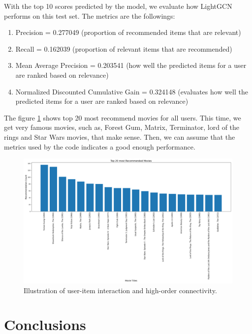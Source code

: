 \documentclass[12pt]{article}
\numberwithin{equation}{section}
\begin{document}
With the top 10 scores predicted by the model, we evaluate how LightGCN performs on this test set. The metrics are the followings:

\begin{enumerate}
	\item Precision = 0.277049 (proportion of recommended items that are relevant)
	\item Recall = 0.162039 (proportion of relevant items that are recommended)
	\item Mean Average Precision = 0.203541 (how well the predicted items for a user are ranked based on relevance)
	\item Normalized Discounted Cumulative Gain = 0.324148 (evaluates how well the predicted items for a user are ranked based on relevance)
\end{enumerate}

The figure \ref{fig:top_20_movies} shows top 20 most recommend movies for all users. This time, we get very famous movies, such as, Forest Gum, Matrix, Terminator, lord of the rings and Star Wars movies, that make sense. Then, we can assume that the metrics used by the code indicates a good enough performance.


\begin{figure}[h]
	\centering
	\includegraphics[width=1\textwidth]{top_20_movies.png}
	\caption{Illustration of user-item interaction and high-order connectivity.}
	\label{fig:top_20_movies}
\end{figure}


\section{Conclusions}

\vspace{1em} 




\newpage



\printbibliography
\end{document}
